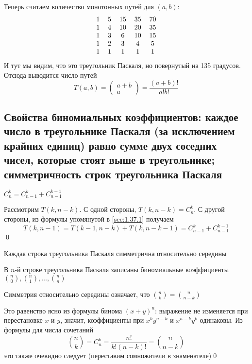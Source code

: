 \documentclass[a4paper]{article}
\begin{document}
Теперь считаем количество монотонных путей для $(a,b):$
\begin{equation*}
    \begin{tabular}{ccccc}
        1& 5 &15  &35  &70 \\
       1 &4  &10  &20  &35 \\
        1& 3 &6  &10  &15 \\
        1& 2 &3  &4  &5 \\
        1& 1 & 1 & 1 &1 \\
   \end{tabular}
\end{equation*}
И тут мы видим, что это треугольник Паскаля, но повернутый на 135 градусов. Отсюда выводится число путей 
\begin{equation*}
    T(a,b)=\begin{pmatrix}
        a+b\\
        a
    \end{pmatrix}=\frac{(a+b)!}{a!b!}
\end{equation*}


\subsection{Свойства биномиальных коэффициентов: каждое число в треугольнике Паскаля (за исключением крайних единиц) равно сумме двух соседних чисел, которые стоят выше в треугольнике; симметричность строк треугольника Паскаля}
\theorem $C_n^k=C_{n-1}^k+C_{n-1}^{k-1}$

\proof Рассмотрим $T(k,n-k)$. С одной стороны, $T(k,n-k)=C_n^k$. С другой стороны, из формулы упомянутой в \ref{sec:1.37.1} получаем 
\begin{equation*}
    T(k,n-1)=T(k-1,n-k)+T(k,n-k-1)=C_{n-1}^k+C_{n-1}^{k-1}
\end{equation*}\qed 

\theorem Каждая строка треугольника Паскаля симметрична относительно середины

\proof В $n$-й строке треугольника Паскаля записаны биномиальные коэффициенты $\binom{n}{0},\binom{n}{1},\ldots,\binom{n}{n}$

Симметрия относительно середины означает, что $\binom{n}{k}=\binom{n}{n-k}$

Это равенство ясно из формулы бинома $(x+y)^n$: выражение не изменяется при перестановке $x$ и $y$, значит, коэффициенты при $x^ky^{n-k}$ и $x^{n-k}y^k$ одинаковы. Из формулы для числа сочетаний
\begin{equation*}
    \binom{n}{k}=C_n^k=\frac{n!}{k!(n-k)!}=\binom{n}{n-k}
\end{equation*}
это также очевидно следует (переставим сомножители в знаменателе)\qed 
\end{document}
